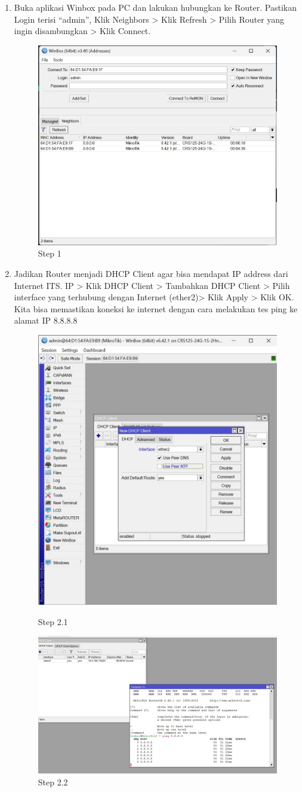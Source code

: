 \begin{enumerate}
	\item Buka aplikasi Winbox pada PC dan lakukan hubungkan ke Router. Pastikan Login terisi “admin”,
	Klik Neighbors > Klik Refresh > Pilih Router yang ingin disambungkan > Klik Connect.
	
	\begin{figure}[H]
		\centering
		\includegraphics[width=0.5\linewidth]{P4/img/2step1.jpg}
		\caption{Step 1}
		\label{fig:gambar1}
	\end{figure}

	\item Jadikan Router menjadi DHCP Client agar bisa mendapat IP address dari Internet ITS. IP >
	Klik DHCP Client > Tambahkan DHCP Client > Pilih interface yang terhubung dengan Internet
	(ether2)> Klik Apply > Klik OK. Kita bisa memastikan koneksi ke internet dengan cara melakukan
	tes ping ke alamat IP 8.8.8.8	
	
	\begin{figure}[H]
		\centering
		\includegraphics[width=0.5\linewidth]{P4/img/2step2.1.jpg}
		\caption{Step 2.1}
		\label{fig:gambar1}

		\centering
		\includegraphics[width=0.5\linewidth]{P4/img/2step2.2.jpg}
		\caption{Step 2.2}
		\label{fig:gambar1}
	\end{figure}


\end{enumerate}
